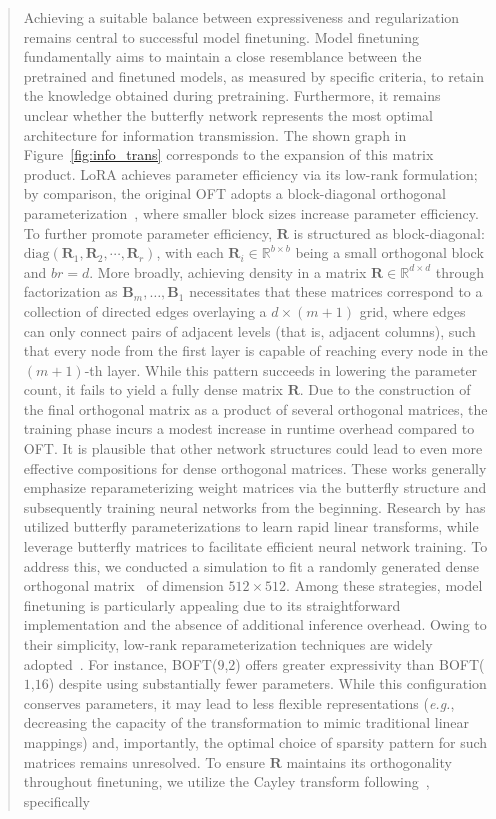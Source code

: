 \begin{abstract}
Achieving a suitable balance between expressiveness and regularization remains central to successful model finetuning. Model finetuning fundamentally aims to maintain a close resemblance between the pretrained and finetuned models, as measured by specific criteria, to retain the knowledge obtained during pretraining. Furthermore, it remains unclear whether the butterfly network represents the most optimal architecture for information transmission. The shown graph in Figure~\ref{fig:info_trans} corresponds to the expansion of this matrix product. LoRA achieves parameter efficiency via its low-rank formulation; by comparison, the original OFT adopts a block-diagonal orthogonal parameterization~\cite{qiu2023controlling}, where smaller block sizes increase parameter efficiency. To further promote parameter efficiency, $\bm{R}$ is structured as block-diagonal: $\text{diag}(\bm{R}_1,\bm{R}_2,\cdots,\bm{R}_r)$, with each $\bm{R}_i\in\mathbb{R}^{b\times b}$ being a small orthogonal block and $br=d$. More broadly, achieving density in a matrix $\bm{R}\in\mathbb{R}^{d\times d}$ through factorization as $\bm{B}_m,\ldots,\bm{B}_1$ necessitates that these matrices correspond to a collection of directed edges overlaying a $d\times (m+1)$ grid, where edges can only connect pairs of adjacent levels (that is, adjacent columns), such that every node from the first layer is capable of reaching every node in the $(m+1)$-th layer. While this pattern succeeds in lowering the parameter count, it fails to yield a fully dense matrix $\bm{R}$. Due to the construction of the final orthogonal matrix as a product of several orthogonal matrices, the training phase incurs a modest increase in runtime overhead compared to OFT. It is plausible that other network structures could lead to even more effective compositions for dense orthogonal matrices. These works generally emphasize reparameterizing weight matrices via the butterfly structure and subsequently training neural networks from the beginning. Research by \cite{dao2019learning,dao2019kaleidoscope} has utilized butterfly parameterizations to learn rapid linear transforms, while \cite{chen2022pixelated,dao2022monarch} leverage butterfly matrices to facilitate efficient neural network training. To address this, we conducted a simulation to fit a randomly generated dense orthogonal matrix~\cite{anderson1987generation} of dimension $512\times 512$. Among these strategies, model finetuning is particularly appealing due to its straightforward implementation and the absence of additional inference overhead. Owing to their simplicity, low-rank reparameterization techniques are widely adopted~\cite{dettmers2023qlora,zi2023delta,chavan2023one}. For instance, BOFT($9$,$2$) offers greater expressivity than BOFT($1$,$16$) despite using substantially fewer parameters. While this configuration conserves parameters, it may lead to less flexible representations (\emph{e.g.}, decreasing the capacity of the transformation to mimic traditional linear mappings) and, importantly, the optimal choice of sparsity pattern for such matrices remains unresolved. To ensure $\bm{R}$ maintains its orthogonality throughout finetuning, we utilize the Cayley transform following~\cite{qiu2023controlling,liu2021orthogonal}, specifically 
\end{abstract}
